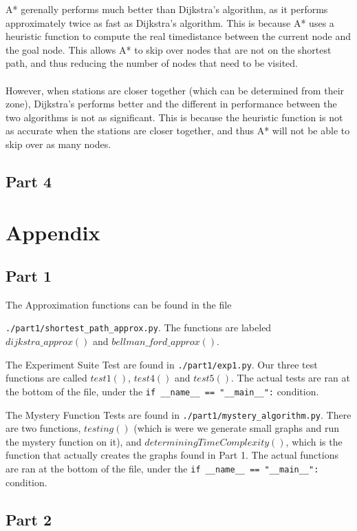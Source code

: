 \documentclass{article}
\begin{document}
A* gerenally performs much better than Dijkstra’s algorithm, as it performs approximately twice as fast as Dijkstra’s algorithm. This is because A* uses a heuristic function to compute the real timedistance between the current node and the goal node. This allows A* to skip over nodes that are not on the shortest path, and thus reducing the number of nodes that need to be visited.\\
\\
However, when stations are closer together (which can be determined from their zone), Dijkstra’s performs better and the different in performance between the two algorithms is not as significant. This is because the heuristic function is not as accurate when the stations are closer together, and thus A* will not be able to skip over as many nodes.\\

\subsection{Part 4}


\newpage
\section{Appendix}

\subsection{Part 1}

The Approximation functions can be found in the file

\verb|./part1/shortest_path_approx.py|.
The functions are labeled $dijkstra\_approx()$ and $bellman\_ford\_approx()$.

The Experiment Suite Test are found in \verb|./part1/exp1.py|. Our three test functions are called $test1()$, $test4()$ and  $test5()$. The actual tests are ran at the bottom of the file, under the \verb|if __name__ == "__main__":| condition.

The Mystery Function Tests are found in \verb|./part1/mystery_algorithm.py|. There are two functions, $testing()$ (which is were we generate small graphs and run the mystery function on it), and $determiningTimeComplexity()$, which is the function that actually creates the graphs found in Part 1. The actual functions are ran at the bottom of the file, under the \verb|if __name__ == "__main__":| condition.

\subsection{Part 2}
\end{document}
